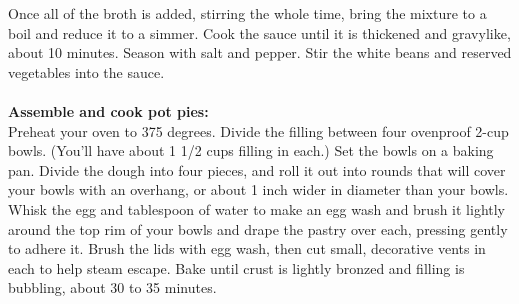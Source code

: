 \begin{recipe}
{\step Once all of the broth is added, stirring the whole time, bring the mixture to a boil and reduce it to a simmer.
\step Cook the sauce until it is thickened and gravylike, about 10 minutes. Season with salt and pepper.
\step Stir the white beans and reserved vegetables into the sauce.\\ 

\\ \textbf{Assemble and cook pot pies:}\\ 
\step Preheat your oven to 375 degrees. Divide the filling between four ovenproof 2-cup bowls. (You’ll have about 1 1/2 cups filling in each.)
\step Set the bowls on a baking pan. Divide the dough into four pieces, and roll it out into rounds that will cover your bowls with an overhang, or about 1 inch wider in diameter than your bowls. 
\step Whisk the egg and tablespoon of water to make an egg wash and brush it lightly around the top rim of your bowls and drape the pastry over each, pressing gently to adhere it. 
\step Brush the lids with egg wash, then cut small, decorative vents in each to help steam escape. 
\step Bake until crust is lightly bronzed and filling is bubbling, about 30 to 35 minutes.
}
\end{recipe}
